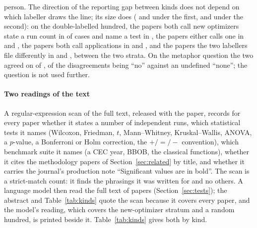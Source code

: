 \documentclass[preprint,review,12pt]{elsarticle}
\begin{document}
person. The direction of the reporting gap between kinds does not depend on which labeller draws the line; its size does (\nSkNewOptimizerPctRunsStated{} and \nSkNewOptimizerPctTestNamed{} under the first, \nKafStSecondNewOptimizerRuns{} and \nKafStSecondNewOptimizerTest{} under the second): on the double-labelled hundred, the papers both call new optimizers state a run count in \nKaStBothNewOptimizerRuns{} of cases and name a test in \nKaStBothNewOptimizerTest{}, the papers either calls one in \nKaStEitherNewOptimizerRuns{} and \nKaStEitherNewOptimizerTest{}, the papers both call applications in \nKaStBothApplicationRuns{} and \nKaStBothApplicationTest{}, and the \nKaStDisputedPapers{} papers the two labellers file differently in \nKaStDisputedRuns{} and \nKaStDisputedTest{}, between the two strata. On the metaphor question the two agreed on \nKaMetaphorAgree{} of \nKaMetaphorPapers{}, \nKaMetaphorNoneDisagreements{} of the disagreements being ``no'' against an undefined ``none''; the question is not used further.

\paragraph{Two readings of the text} A regular-expression scan of the full text, released with the paper, records for every paper whether it states a number of independent runs, which statistical tests it names (Wilcoxon, Friedman, $t$, Mann--Whitney, Kruskal--Wallis, ANOVA, a $p$-value, a Bonferroni or Holm correction, the $+/=/-$ convention), which benchmark suite it names (a CEC year, BBOB, the classical functions), whether it cites the methodology papers of Section~\ref{sec:related} by title, and whether it carries the journal's production note ``Significant values are in bold''. The scan is a strict-match count: it finds the phrasings it was written for and no others. A language model then read the full text of \nTrAllPapers{} papers (Section~\ref{sec:tests}); the abstract and Table~\ref{tab:kinds} quote the scan because it covers every paper, and the model's reading, which covers the new-optimizer stratum and a random hundred, is printed beside it. Table~\ref{tab:kinds} gives both by kind.
\end{document}
